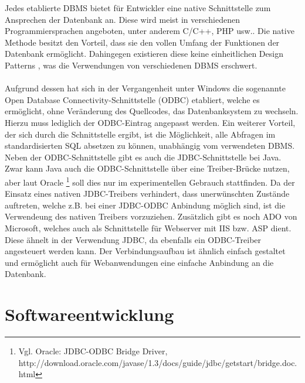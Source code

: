 Jedes etablierte DBMS bietet für Entwickler eine native Schnittstelle zum Ansprechen der Datenbank an.
Diese wird meist in verschiedenen Programmiersprachen angeboten, unter anderem C/C++, PHP usw..
Die native Methode besitzt den Vorteil, dass sie den vollen Umfang der Funktionen der Datenbank ermöglicht. Dahingegen existieren diese keine einheitlichen Design Patterns , was die Verwendungen von verschiedenen DBMS erschwert.\\\\
Aufgrund dessen hat sich in der Vergangenheit unter Windows die sogenannte Open Database Connectivity-Schnittstelle (ODBC) etabliert, welche es ermöglicht, ohne Veränderung des Quellcodes, das Datenbanksystem zu wechseln.
Hierzu muss lediglich der ODBC-Eintrag angepasst werden.
Ein weiterer Vorteil, der sich durch die Schnittstelle ergibt, ist die Möglichkeit, alle Abfragen im standardisierten SQL absetzen zu können, unabhängig vom verwendeten DBMS.
Neben der ODBC-Schnittstelle gibt es auch die JDBC-Schnittstelle bei Java.
Zwar kann Java auch die ODBC-Schnittstelle über eine Treiber-Brücke nutzen, aber laut Oracle \footnote{Vgl. Oracle: JDBC-ODBC Bridge Driver, http://download.oracle.com/javase/1.3/docs/guide/jdbc/getstart/bridge.doc.html} soll dies nur im experimentellen Gebrauch stattfinden.
Da der Einsatz eines nativen JDBC-Treibers verhindert, dass unerwünschten Zustände auftreten, welche z.B. bei einer JDBC-ODBC Anbindung möglich sind, ist die Verwendeung des nativen Treibers vorzuziehen.
Zusätzlich gibt es noch ADO von Microsoft, welches auch als Schnittstelle für Webserver mit IIS bzw. ASP dient.
Diese ähnelt in der Verwendung JDBC, da ebenfalls ein ODBC-Treiber angesteuert werden kann.
Der Verbindungsaufbau ist ähnlich einfach gestaltet und ermöglicht auch für Webanwendungen eine einfache Anbindung an die Datenbank.

\section{Softwareentwicklung}
\label{sec:softdev}

